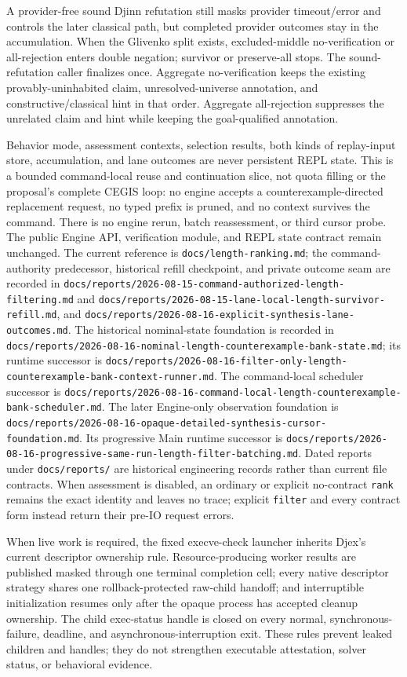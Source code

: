 \documentclass[11pt,oneside]{article}
\newcommand{\code}[1]{\texttt{#1}}
\begin{document}
A provider-free sound Djinn refutation still masks provider timeout/error and
controls the later classical path, but completed provider outcomes stay in the
accumulation. When the Glivenko split exists, excluded-middle no-verification
or all-rejection enters double negation; survivor or preserve-all stops. The
sound-refutation caller finalizes once. Aggregate no-verification keeps the
existing provably-uninhabited claim, unresolved-universe annotation, and
constructive/classical hint in that order. Aggregate all-rejection suppresses
the unrelated claim and hint while keeping the goal-qualified annotation.

Behavior mode, assessment contexts, selection results, both kinds of
replay-input store, accumulation, and lane outcomes are never persistent REPL
state. This is a bounded command-local reuse and continuation slice, not quota
filling or the proposal's complete CEGIS loop: no engine accepts a
counterexample-directed replacement request, no typed prefix is pruned, and no
context survives the command. There is no engine rerun, batch reassessment, or
third cursor probe. The public Engine API, verification module, and REPL state
contract remain unchanged. The current reference
is \code{docs/length-ranking.md}; the command-authority predecessor, historical
refill checkpoint, and private outcome seam are recorded in
\code{docs/reports/2026-08-15-command-authorized-length-filtering.md} and
\code{docs/reports/2026-08-15-lane-local-length-survivor-refill.md}, and
\code{docs/reports/2026-08-16-explicit-synthesis-lane-outcomes.md}. The
historical nominal-state foundation is recorded in
\code{docs/reports/2026-08-16-nominal-length-counterexample-bank-state.md}; its
runtime successor is
\code{docs/reports/2026-08-16-filter-only-length-counterexample-bank-context-runner.md}.
The command-local scheduler successor is
\code{docs/reports/2026-08-16-command-local-length-counterexample-bank-scheduler.md}.
The later Engine-only observation foundation is
\code{docs/reports/2026-08-16-opaque-detailed-synthesis-cursor-foundation.md}.
Its progressive Main runtime successor is
\code{docs/reports/2026-08-16-progressive-same-run-length-filter-batching.md}.
Dated
reports under \code{docs/reports/} are historical engineering records rather
than current file contracts. When assessment is disabled, an ordinary or
explicit no-contract \code{rank} remains the exact identity and leaves no
trace; explicit \code{filter} and every contract form instead return their
pre-IO request errors.

When live work is required, the fixed execve-check launcher inherits Djex's
current descriptor ownership rule. Resource-producing worker results are
published masked through one terminal completion cell; every native descriptor
strategy shares one rollback-protected raw-child handoff; and interruptible
initialization resumes only after the opaque process has accepted cleanup
ownership. The child exec-status handle is closed on every normal,
synchronous-failure, deadline, and asynchronous-interruption exit. These rules
prevent leaked children and handles; they do not strengthen executable
attestation, solver status, or behavioral evidence.
\end{document}
